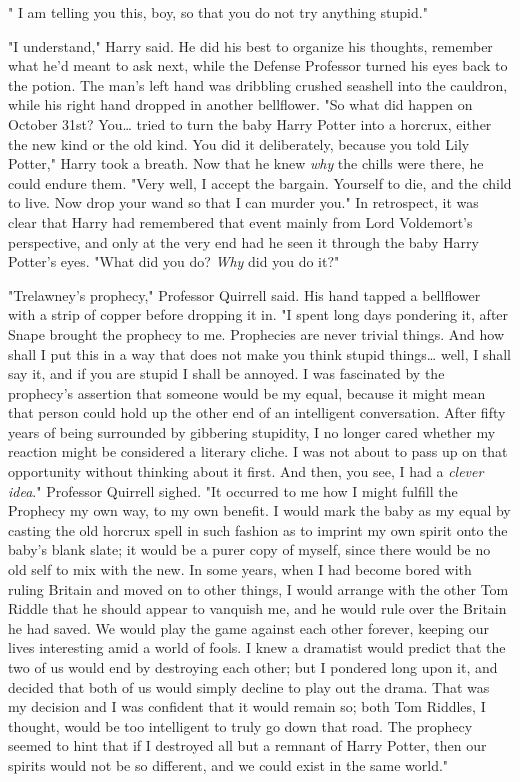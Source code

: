 " I am telling you this, boy, so that you do not 
try anything stupid."

"I understand," Harry said. He did his best to organize his thoughts, remember 
what he'd meant to ask next, while the Defense Professor turned his eyes back 
to the potion. The man's left hand was dribbling crushed seashell into the 
cauldron, while his right hand dropped in another bellflower. "So what did 
happen on October 31st? You{\ldots} tried to turn the baby Harry Potter into a 
horcrux, either the new kind or the old kind. You did it deliberately, because 
you told Lily Potter," Harry took a breath. Now that he knew \emph{why} the 
chills were there, he could endure them. "Very well, I accept the bargain. 
Yourself to die, and the child to live. Now drop your wand so that I can murder 
you." In retrospect, it was clear that Harry had remembered that event mainly 
from Lord Voldemort's perspective, and only at the very end had he seen it 
through the baby Harry Potter's eyes. "What did you do? \emph{Why} did you do 
it?"

"Trelawney's prophecy," Professor Quirrell said. His hand tapped a bellflower 
with a strip of copper before dropping it in. "I spent long days pondering it, 
after Snape brought the prophecy to me. Prophecies are never trivial things. 
And how shall I put this in a way that does not make you think stupid 
things{\ldots} well, I shall say it, and if you are stupid I shall be annoyed. 
I was fascinated by the prophecy's assertion that someone would be my equal, 
because it might mean that person could hold up the other end of an intelligent 
conversation. After fifty years of being surrounded by gibbering stupidity, I 
no longer cared whether my reaction might be considered a literary cliche. I 
was not about to pass up on that opportunity without thinking about it first. 
And then, you see, I had a \emph{clever idea}." Professor Quirrell sighed. "It 
occurred to me how I might fulfill the Prophecy my own way, to my own benefit. 
I would mark the baby as my equal by casting the old horcrux spell in such 
fashion as to imprint my own spirit onto the baby's blank slate; it would be a 
purer copy of myself, since there would be no old self to mix with the new. In 
some years, when I had become bored with ruling Britain and moved on to other 
things, I would arrange with the other Tom Riddle that he should appear to 
vanquish me, and he would rule over the Britain he had saved. We would play the 
game against each other forever, keeping our lives interesting amid a world of 
fools. I knew a dramatist would predict that the two of us would end by 
destroying each other; but I pondered long upon it, and decided that both of us 
would simply decline to play out the drama. That was my decision and I was 
confident that it would remain so; both Tom Riddles, I thought, would be too 
intelligent to truly go down that road. The prophecy seemed to hint that if I 
destroyed all but a remnant of Harry Potter, then our spirits would not be so 
different, and we could exist in the same world."

